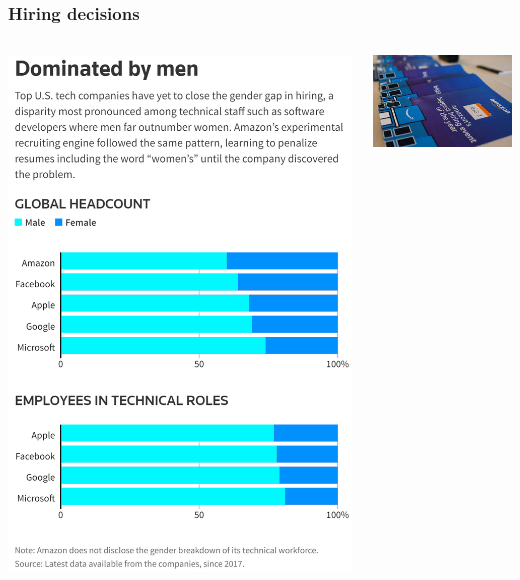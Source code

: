 \begin{frame}
  \frametitle{Hiring decisions}
  \begin{columns}
    \begin{column}{0.5\textwidth}
      \includegraphics[height=\textheight]{../figures/cmu-headcount}
    \end{column}
    \begin{column}{0.5\textwidth}
      \includegraphics[width=\columnwidth]{../figures/amazon-hiring}

\end{column}
\end{columns}
\end{frame}
